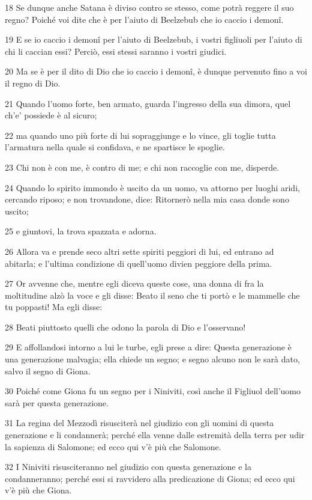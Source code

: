 \par 18 Se dunque anche Satana è diviso contro se stesso, come potrà reggere il suo regno? Poiché voi dite che è per l'aiuto di Beelzebub che io caccio i demonî.
\par 19 E se io caccio i demonî per l'aiuto di Beelzebub, i vostri figliuoli per l'aiuto di chi li caccian essi? Perciò, essi stessi saranno i vostri giudici.
\par 20 Ma se è per il dito di Dio che io caccio i demonî, è dunque pervenuto fino a voi il regno di Dio.
\par 21 Quando l'uomo forte, ben armato, guarda l'ingresso della sua dimora, quel ch'e' possiede è al sicuro;
\par 22 ma quando uno più forte di lui sopraggiunge e lo vince, gli toglie tutta l'armatura nella quale si confidava, e ne spartisce le spoglie.
\par 23 Chi non è con me, è contro di me; e chi non raccoglie con me, disperde.
\par 24 Quando lo spirito immondo è uscito da un uomo, va attorno per luoghi aridi, cercando riposo; e non trovandone, dice: Ritornerò nella mia casa donde sono uscito;
\par 25 e giuntovi, la trova spazzata e adorna.
\par 26 Allora va e prende seco altri sette spiriti peggiori di lui, ed entrano ad abitarla; e l'ultima condizione di quell'uomo divien peggiore della prima.
\par 27 Or avvenne che, mentre egli diceva queste cose, una donna di fra la moltitudine alzò la voce e gli disse: Beato il seno che ti portò e le mammelle che tu poppasti! Ma egli disse:
\par 28 Beati piuttosto quelli che odono la parola di Dio e l'osservano!
\par 29 E affollandosi intorno a lui le turbe, egli prese a dire: Questa generazione è una generazione malvagia; ella chiede un segno; e segno alcuno non le sarà dato, salvo il segno di Giona.
\par 30 Poiché come Giona fu un segno per i Niniviti, così anche il Figliuol dell'uomo sarà per questa generazione.
\par 31 La regina del Mezzodì risusciterà nel giudizio con gli uomini di questa generazione e li condannerà; perché ella venne dalle estremità della terra per udir la sapienza di Salomone; ed ecco qui v'è più che Salomone.
\par 32 I Niniviti risusciteranno nel giudizio con questa generazione e la condanneranno; perché essi si ravvidero alla predicazione di Giona; ed ecco qui v'è più che Giona.
